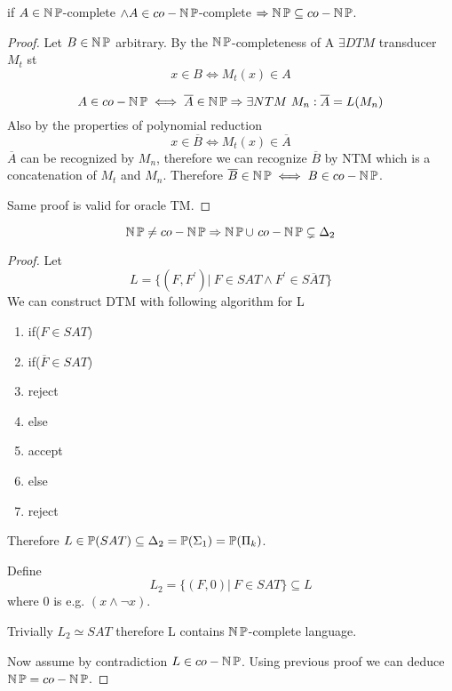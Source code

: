 \begin{theorem}[NP = co-NP]
	if $A \in \operatorname{\operatorname{\mathbb{N}}\mathbb{P}}$-complete $\land A \in co-\operatorname{\operatorname{\mathbb{N}}\mathbb{P}}$-complete $\Rightarrow \operatorname{\operatorname{\mathbb{N}}\mathbb{P}} \subseteq co-\operatorname{\operatorname{\mathbb{N}}\mathbb{P}}$.
\end{theorem}
\begin{proof}
	Let $B \in \operatorname{\operatorname{\mathbb{N}}\mathbb{P}}$ arbitrary.
	By the $\operatorname{\operatorname{\mathbb{N}}\mathbb{P}}$-completeness of A $\exists DTM$ transducer $M_t$ st
	\[ x \in B \iff M_t(x) \in A \]

	\[ A \in co-\operatorname{\operatorname{\mathbb{N}}\mathbb{P}} \iff \overline{A} \in \operatorname{\operatorname{\mathbb{N}}\mathbb{P}} \Rightarrow \exists NTM\ M_n: \overline{A} = L(M_n) \]
	Also by the properties of polynomial reduction
	\[ x \in \overline{B} \iff M_t(x) \in \overline{A} \]
	$\overline{A}$ can be recognized by $M_n$, therefore we can recognize $\overline{B}$ by NTM which is a concatenation of $M_t$ and $M_n$.
	Therefore $\overline{B} \in \operatorname{\operatorname{\mathbb{N}}\mathbb{P}} \iff B \in co-\operatorname{\operatorname{\mathbb{N}}\mathbb{P}} $.

	Same proof is valid for oracle TM.
\end{proof}

\begin{theorem}[NP $\neq$ co-NP]
	\[ \TNP \ne co-\TNP \Rightarrow \TNP \cup\ co-\TNP \subsetneq \Delta_2 \]
\end{theorem}
\begin{proof}
	Let
	\[ L = \{ (F, F^{\prime}) |\ F \in SAT \land F^{\prime} \in \overline{SAT} \} \]
	We can construct DTM with following algorithm for L

	\begin{enumerate}
		\item if($F \in SAT$)
		\item \tab if($\overline{F} \in SAT$)
		\item \tab \tab reject
		\item \tab else
		\item \tab \tab accept
		\item else
		\item \tab reject
	\end{enumerate}

	Therefore $L \in \operatorname{\mathbb{P}}(SAT) \subseteq \Delta_2 = \operatorname{\mathbb{P}}(\Sigma_1) = \operatorname{\mathbb{P}}(\Pi_k)$.

	Define
	\[ L_2 = \{ (F, 0)|\ F \in SAT \} \subseteq L \]
	where $0$ is e.g. $(x \land \neg x)$.

	Trivially $ L_2 \simeq SAT$ therefore L contains $\operatorname{\operatorname{\mathbb{N}}\mathbb{P}}$-complete language.

	Now assume by contradiction $L \in co-\operatorname{\operatorname{\mathbb{N}}\mathbb{P}}$.
	Using previous proof we can deduce $\operatorname{\operatorname{\mathbb{N}}\mathbb{P}} = co-\operatorname{\operatorname{\mathbb{N}}\mathbb{P}}$.
\end{proof}


